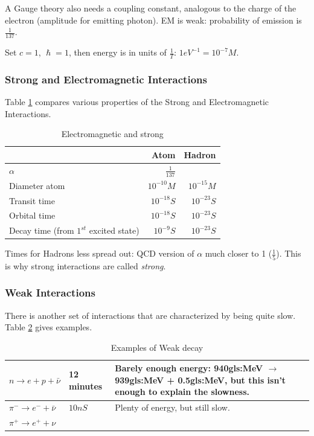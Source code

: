 \documentclass[]{article}
\begin{document}
A Gauge theory also needs a coupling constant, analogous to the charge of the electron (amplitude for emitting photon). EM is weak: probability of emission is $\frac{1}{137}$.

Set $c=1$, $\hslash=1$, then energy is in units of $\frac{1}{T}$: $1eV^{-1}=10^{-7}M$.

\subsubsection{Strong and Electromagnetic Interactions}

Table \ref{table:ems} compares various properties of the Strong and Electromagnetic Interactions.

\begin{table}[H]
	\begin{center}
		\caption{Electromagnetic and strong}\label{table:ems}
		\begin{tabular}{|l|r|r|} \hline
			&Atom&Hadron \\ \hline
			$\alpha$&$\frac{1}{137}$&\\ \hline	
			Diameter atom&$10^{-10}M$&$10^{-15}M$ \\ \hline
			Transit time &$10^{-18}S$&$10^{-23}S$\\ \hline
			Orbital time &$10^{-18}S$&$10^{-23}S$\\ \hline
			Decay time (from $1^{st}$ excited state)&$10^{-9}S$&$10^{-23}S$\\ \hline
		\end{tabular}
	\end{center}
\end{table}

Times for Hadrons less spread out: QCD version of $\alpha$ much closer to 1 ($\frac{1}{5}$). This is why strong interactions are called \emph{strong}.

\subsubsection{Weak Interactions}

There is another set of interactions that are characterized by being quite slow. Table \ref{table:ex:weak} gives examples.

\begin{table}[H]
	\begin{center}
		\caption{Examples of Weak decay}\label{table:ex:weak}
		\begin{tabular}{|l|l|p{6cm}|}\hline
			$n \rightarrow e + p +\bar{\nu}$&12 minutes&Barely enough energy: 940\gls{gls:MeV} $\rightarrow$ 939\gls{gls:MeV} + 0.5\gls{gls:MeV}, but this isn't enough to explain the slowness.\\ \hline
			$\pi^- \rightarrow e^- + \bar{\nu} $&$10nS$&Plenty of energy, but still slow.\\ \hline
			$\pi^+ \rightarrow e^+ + \nu $&&\\ \hline
		\end{tabular}
	\end{center}
\end{table}
\end{document}
